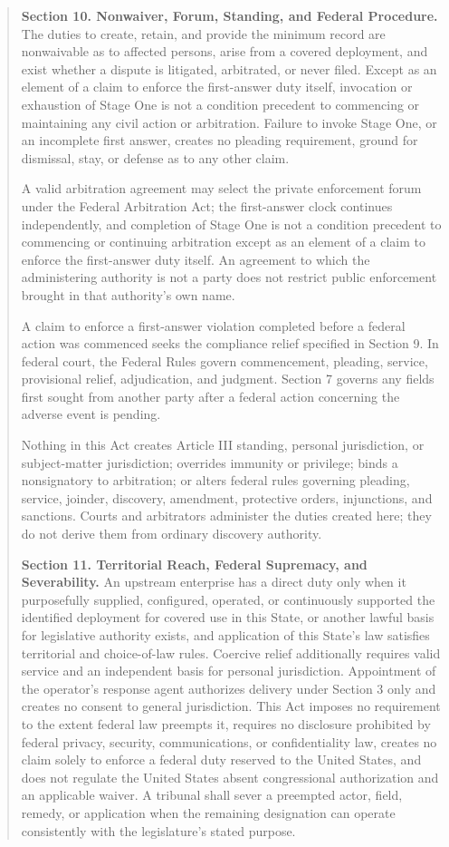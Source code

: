 \begin{quote}
\textbf{Section 10. Nonwaiver, Forum, Standing, and Federal Procedure.} The duties to create, retain, and provide the minimum record are nonwaivable as to affected persons, arise from a covered deployment, and exist whether a dispute is litigated, arbitrated, or never filed. Except as an element of a claim to enforce the first-answer duty itself, invocation or exhaustion of Stage One is not a condition precedent to commencing or maintaining any civil action or arbitration. Failure to invoke Stage One, or an incomplete first answer, creates no pleading requirement, ground for dismissal, stay, or defense as to any other claim.

A valid arbitration agreement may select the private enforcement forum under the Federal Arbitration Act; the first-answer clock continues independently, and completion of Stage One is not a condition precedent to commencing or continuing arbitration except as an element of a claim to enforce the first-answer duty itself. An agreement to which the administering authority is not a party does not restrict public enforcement brought in that authority's own name.

A claim to enforce a first-answer violation completed before a federal action was commenced seeks the compliance relief specified in Section 9. In federal court, the Federal Rules govern commencement, pleading, service, provisional relief, adjudication, and judgment. Section 7 governs any fields first sought from another party after a federal action concerning the adverse event is pending.

Nothing in this Act creates Article III standing, personal jurisdiction, or subject-matter jurisdiction; overrides immunity or privilege; binds a nonsignatory to arbitration; or alters federal rules governing pleading, service, joinder, discovery, amendment, protective orders, injunctions, and sanctions. Courts and arbitrators administer the duties created here; they do not derive them from ordinary discovery authority.

\textbf{Section 11. Territorial Reach, Federal Supremacy, and Severability.} An upstream enterprise has a direct duty only when it purposefully supplied, configured, operated, or continuously supported the identified deployment for covered use in this State, or another lawful basis for legislative authority exists, and application of this State's law satisfies territorial and choice-of-law rules. Coercive relief additionally requires valid service and an independent basis for personal jurisdiction. Appointment of the operator's response agent authorizes delivery under Section 3 only and creates no consent to general jurisdiction. This Act imposes no requirement to the extent federal law preempts it, requires no disclosure prohibited by federal privacy, security, communications, or confidentiality law, creates no claim solely to enforce a federal duty reserved to the United States, and does not regulate the United States absent congressional authorization and an applicable waiver. A tribunal shall sever a preempted actor, field, remedy, or application when the remaining designation can operate consistently with the legislature's stated purpose.
\end{quote}

